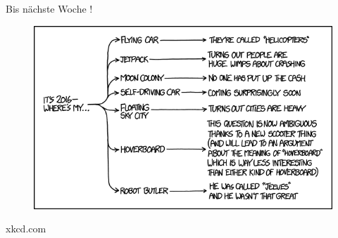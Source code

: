 \documentclass[18pt]{beamer}
\begin{document}
\appendix
\beginbackup

\begin{frame}{Bis nächste Woche !}
    \begin{figure}
        \includegraphics[scale=.5]{img/2016.png}
    \end{figure}

    \begin{flushright}
    \footnotesize{xkcd.com}
    \end{flushright}
\end{frame}

\backupend
\end{document}
